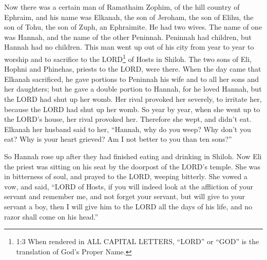 \newpage
\null
\thispagestyle{empty}
\newpage





\vspace{-1.36in}

\mychapter{} \myverse*{}Now there was a certain man of Ramathaim Zophim, of the hill country
of Ephraim, and his name was Elkanah, the son of Jeroham, the son of Elihu, the son of Tohu, the son of
Zuph, an Ephraimite.
\myverse{}He had two wives. The name of one was Hannah, and the name of the other Peninnah.
Peninnah had children, but Hannah had no children.
\myverse{}This man went up out of his city from year to year to worship and to sacrifice
to the LORD\footnote{1:3 When rendered in ALL CAPITAL LETTERS, “LORD” or “GOD” is the translation of God’s Proper Name.}
of Hosts in Shiloh. The two sons of Eli, Hophni and Phinehas, priests to the LORD, were there.
\myverse{}When the day came that Elkanah sacrificed, he gave portions to Peninnah his
wife and to all her sons and her daughters;
\myverse{}but he gave a double portion to Hannah, for he loved Hannah, but the LORD had
shut up her womb.
\myverse{}Her rival provoked her severely, to irritate her, because the LORD had shut
up her womb.
\myverse{}So year by year, when she went up to the LORD’s house, her rival provoked her.
Therefore she wept, and didn’t eat.
\myverse{}Elkanah her husband said to her, “Hannah, why do you weep? Why don’t you eat?
Why is your heart grieved? Am I not better to you than ten sons?”

\myverse{}So Hannah rose up after they had finished eating and drinking in
Shiloh. Now Eli the priest was sitting on his seat by the doorpost of the LORD’s temple.
\myverse{}She was in bitterness of soul, and prayed to the LORD, weeping bitterly.
\myverse{}She vowed a vow, and said, “LORD of Hosts, if you will indeed look at the
affliction of your servant and remember me, and not forget your servant, but will give to your servant
a boy, then I will give him to the LORD all the days of his life, and no razor shall come on his head.”

